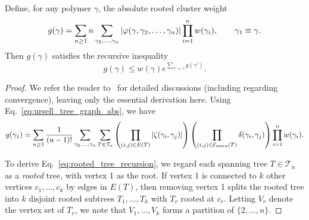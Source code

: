 \begin{lemma}\label{lem:rooted}
Define, for any polymer $\gamma$, the {absolute rooted cluster weight}
\begin{equation}
    g(\gamma) = \sum_{n \geq 1} n \sum_{\gamma_2,\dots,\gamma_n} \abs{\varphi(\gamma,\gamma_2, \dots,\gamma_n)} \prod_{i = 1}^n w(\gamma_i),\qquad \gamma_1 \equiv \gamma.
\end{equation}
Then $g(\gamma)$ satisfies the recursive inequality 
\begin{equation}
\label{eq:rooted_tree_recursion}
    g(\gamma) \leq w(\gamma) e^{\sum_{\gamma' \nsim \gamma} g(\gamma')}.
\end{equation}
\end{lemma}
\begin{proof}
    We refer the reader to~\cite{KoteckyPreiss1986,FernandezProcacci2007,Ueltschi2003} for detailed discussions (including regarding convergence), leaving only the essential derivation here. Using Eq.~\eqref{eq:ursell_tree_graph_abs}, we have 
    \begin{equation}
        g(\gamma_1) = \sum_{n \geq 1} \frac{1}{(n-1)!} \sum_{\gamma_2,\dots,\gamma_n} \sum_{T \in \mathcal{T}_n} \left( \prod_{(i,j) \in E(T)}\abs{\zeta(\gamma_i,\gamma_j)}  \right) \left(  \prod_{(i,j) \in \mathcal{E}_{\text{extra}}(T)} \delta(\gamma_i,\gamma_j)  \right)  \prod_{i = 1}^n w(\gamma_i) .
        \label{eqn:gtree1}
    \end{equation}

    To derive Eq.~\eqref{eq:rooted_tree_recursion}, we regard each spanning tree $T \in \mathcal{T}_n$ as a \emph{rooted} tree, with vertex 1 as the root. If vertex 1 is connected to $k$ other vertices $c_1, \ldots , c_k$ by edges in $E(T)$, then removing vertex 1 splits the rooted tree into $k$ disjoint rooted subtrees $T_1, \ldots , T_k$ with $T_r$ rooted at $c_r$. Letting $V_r$ denote the vertex set of $T_r$, we note that $V_1, \ldots , V_k$ forms a partition of $\{ 2, \ldots , n \}$.


\end{proof}

